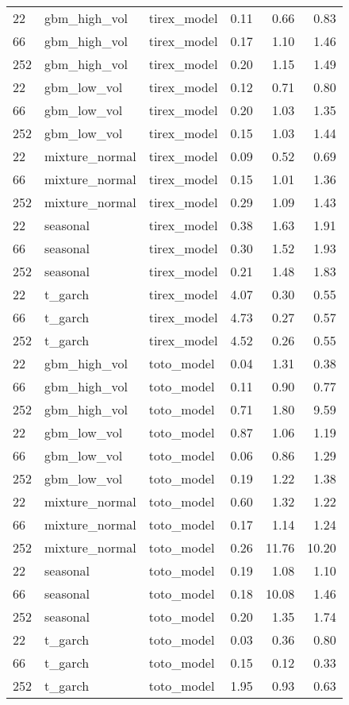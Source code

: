 {\begin{tabular}{lllrrr}
\midrule
22 & gbm\_high\_vol & tirex\_model & 0.11 & 0.66 & 0.83 \\
66 & gbm\_high\_vol & tirex\_model & 0.17 & 1.10 & 1.46 \\
252 & gbm\_high\_vol & tirex\_model & 0.20 & 1.15 & 1.49 \\
\midrule
22 & gbm\_low\_vol & tirex\_model & 0.12 & 0.71 & 0.80 \\
66 & gbm\_low\_vol & tirex\_model & 0.20 & 1.03 & 1.35 \\
252 & gbm\_low\_vol & tirex\_model & 0.15 & 1.03 & 1.44 \\
\midrule
22 & mixture\_normal & tirex\_model & 0.09 & 0.52 & 0.69 \\
66 & mixture\_normal & tirex\_model & 0.15 & 1.01 & 1.36 \\
252 & mixture\_normal & tirex\_model & 0.29 & 1.09 & 1.43 \\
\midrule
22 & seasonal & tirex\_model & 0.38 & 1.63 & 1.91 \\
66 & seasonal & tirex\_model & 0.30 & 1.52 & 1.93 \\
252 & seasonal & tirex\_model & 0.21 & 1.48 & 1.83 \\
\midrule
22 & t\_garch & tirex\_model & 4.07 & 0.30 & 0.55 \\
66 & t\_garch & tirex\_model & 4.73 & 0.27 & 0.57 \\
252 & t\_garch & tirex\_model & 4.52 & 0.26 & 0.55 \\
\midrule
22 & gbm\_high\_vol & toto\_model & 0.04 & 1.31 & 0.38 \\
66 & gbm\_high\_vol & toto\_model & 0.11 & 0.90 & 0.77 \\
252 & gbm\_high\_vol & toto\_model & 0.71 & 1.80 & 9.59 \\
\midrule
22 & gbm\_low\_vol & toto\_model & 0.87 & 1.06 & 1.19 \\
66 & gbm\_low\_vol & toto\_model & 0.06 & 0.86 & 1.29 \\
252 & gbm\_low\_vol & toto\_model & 0.19 & 1.22 & 1.38 \\
\midrule
22 & mixture\_normal & toto\_model & 0.60 & 1.32 & 1.22 \\
66 & mixture\_normal & toto\_model & 0.17 & 1.14 & 1.24 \\
252 & mixture\_normal & toto\_model & 0.26 & 11.76 & 10.20 \\
\midrule
22 & seasonal & toto\_model & 0.19 & 1.08 & 1.10 \\
66 & seasonal & toto\_model & 0.18 & 10.08 & 1.46 \\
252 & seasonal & toto\_model & 0.20 & 1.35 & 1.74 \\
\midrule
22 & t\_garch & toto\_model & 0.03 & 0.36 & 0.80 \\
66 & t\_garch & toto\_model & 0.15 & 0.12 & 0.33 \\
252 & t\_garch & toto\_model & 1.95 & 0.93 & 0.63 \\
\bottomrule
\end{tabular}
}